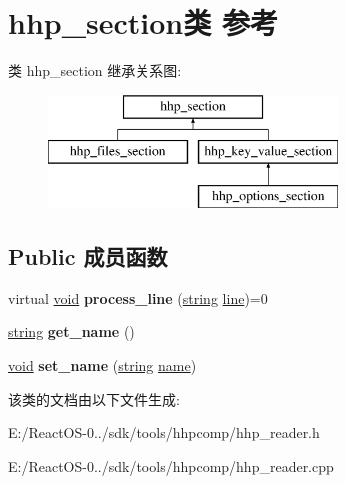 \hypertarget{classhhp__section}{}\section{hhp\+\_\+section类 参考}
\label{classhhp__section}
类 hhp\+\_\+section 继承关系图\+:\begin{figure}[H]
\begin{center}
\leavevmode
\includegraphics[height=3.000000cm]{classhhp__section}
\end{center}
\end{figure}
\subsection*{Public 成员函数}
\begin{DoxyCompactItemize}
\item 
\mbox{\label{classhhp__section_ad964620aeb80cb2c51b645d12e71dbe1}} 
virtual \hyperlink{interfacevoid}{void} {\bfseries process\+\_\+line} (\hyperlink{structstring}{string} \hyperlink{structline}{line})=0
\item 
\mbox{\label{classhhp__section_aada236d724cdfc67912045866e42fe69}} 
\hyperlink{structstring}{string} {\bfseries get\+\_\+name} ()
\item 
\mbox{\label{classhhp__section_a6a70856d0377dfd0fcd6d8c251fa162a}} 
\hyperlink{interfacevoid}{void} {\bfseries set\+\_\+name} (\hyperlink{structstring}{string} \hyperlink{structname}{name})
\end{DoxyCompactItemize}


该类的文档由以下文件生成\+:\begin{DoxyCompactItemize}
\item 
E\+:/\+React\+O\+S-\/0../sdk/tools/hhpcomp/hhp\+\_\+reader.\+h\item 
E\+:/\+React\+O\+S-\/0../sdk/tools/hhpcomp/hhp\+\_\+reader.\+cpp\end{DoxyCompactItemize}
